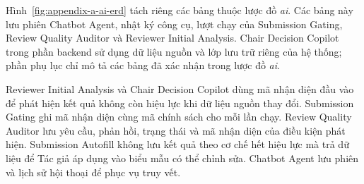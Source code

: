 Hình~\ref{fig:appendix-a-ai-erd} tách riêng các bảng thuộc lược đồ \textit{ai}. Các bảng này lưu phiên Chatbot Agent, nhật ký công cụ, lượt chạy của Submission Gating, Review Quality Auditor và Reviewer Initial Analysis. Chair Decision Copilot trong phần backend sử dụng dữ liệu nguồn và lớp lưu trữ riêng của hệ thống; phần phụ lục chỉ mô tả các bảng đã xác nhận trong lược đồ \textit{ai}.

Reviewer Initial Analysis và Chair Decision Copilot dùng mã nhận diện đầu vào để phát hiện kết quả không còn hiệu lực khi dữ liệu nguồn thay đổi. Submission Gating ghi mã nhận diện cùng mã chính sách cho mỗi lần chạy. Review Quality Auditor lưu yêu cầu, phản hồi, trạng thái và mã nhận diện của điều kiện phát hiện. Submission Autofill không lưu kết quả theo cơ chế hết hiệu lực mà trả dữ liệu để Tác giả áp dụng vào biểu mẫu có thể chỉnh sửa. Chatbot Agent lưu phiên và lịch sử hội thoại để phục vụ truy vết.

